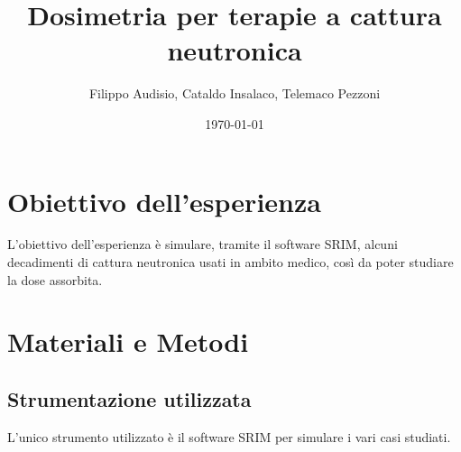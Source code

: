 \documentclass[a4paper,12pt]{article}
\title{\textbf{Dosimetria per terapie a cattura neutronica}}
\author{Filippo Audisio, Cataldo Insalaco, Telemaco Pezzoni}
\date{\today}
\begin{document}
    \maketitle

    \section{Obiettivo dell'esperienza}
        L'obiettivo dell'esperienza è simulare, tramite il software SRIM, alcuni decadimenti di cattura neutronica usati in ambito medico, così da poter studiare la dose assorbita.
    \section{Materiali e Metodi}

        \subsection{Strumentazione utilizzata}
            L'unico strumento utilizzato è il software SRIM per simulare i vari casi studiati.
\end{document}
